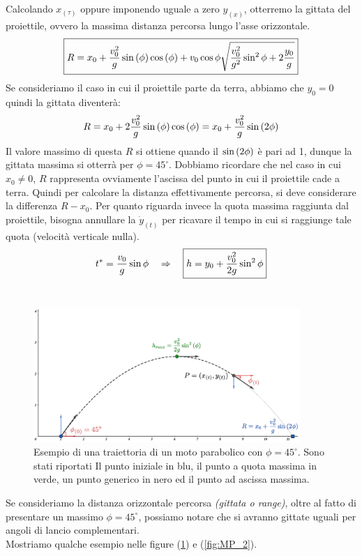 Calcolando $x_{(\tau)}$ oppure imponendo uguale a zero $y_{(x)}$, otterremo
la gittata del proiettile, ovvero la massima distanza percorsa lungo
l'asse orizzontale.
\begin{equation}
    \boxed{R = x_0 + \frac{v_0^2}{g}\sin\left(\phi\right)\cos\left(\phi\right) +
    v_0\cos\phi\sqrt{\frac{v_0^2}{g^2}\sin^2\phi+2\frac{y_0}g}}
\label{eq:range}
\end{equation}
Se consideriamo il caso in cui il proiettile parte da terra,
abbiamo che $y_0 = 0$ quindi la gittata diventerà:
\begin{equation}
    R = x_0 +2\frac{v_0^2}{g}\sin\left(\phi\right)\cos\left(\phi\right) = x_0 + \frac{v_0^2}{g}\sin\left(2\phi\right)
\label{eq:range_0}
\end{equation}
Il valore massimo di questa $R$ si ottiene quando il $\sin\left(2\phi\right)$ è
pari ad 1, dunque la gittata massima si otterrà per $\phi = 45^\circ$.
Dobbiamo ricordare che nel caso in cui $x_0\ne0$, $R$ rappresenta
ovviamente l'ascissa del punto in cui il proiettile cade a terra.
Quindi per calcolare la distanza effettivamente percorsa, si deve
considerare la differenza $R-x_0$.
Per quanto riguarda invece la quota massima raggiunta dal proiettile,
bisogna annullare la $\dot y_{(t)}$ per ricavare il tempo in cui si
raggiunge tale quota (velocità verticale nulla). 
\begin{equation}
    t^* = \frac{v_0}{g}\sin\phi\quad\Rightarrow\quad\boxed{h = y_0 + \frac{v_0^2}{2g}\sin^2\phi}
\label{eq:h_max}
\end{equation}
\\
\begin{figure}[h]
        \includegraphics[width=0.9\textwidth]{images/MP1.png} 
        \caption{Esempio di una traiettoria di un moto parabolico con $\phi = 45^\circ$.
        Sono stati riportati Il punto iniziale in blu, il punto a quota
        massima in verde, un punto generico in nero ed il punto ad ascissa
        massima.}
\label{fig:MP}
\end{figure}
Se consideriamo la distanza orizzontale percorsa \emph{(gittata o range)}, oltre
al fatto di presentare un massimo $\phi = 45^\circ$, possiamo notare che si avranno
gittate uguali per angoli di lancio complementari.\\
Mostriamo qualche esempio nelle figure (\ref{fig:MP}) e (\ref{fig:MP_2}).


